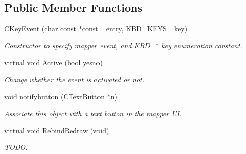 \subsection*{Public Member Functions}
\begin{DoxyCompactItemize}
\item 
\hypertarget{classCKeyEvent_a26db3746811c8498d0f7f4ca7e52d360}{\hyperlink{classCKeyEvent_a26db3746811c8498d0f7f4ca7e52d360}{C\-Key\-Event} (char const $\ast$const \-\_\-entry, K\-B\-D\-\_\-\-K\-E\-Y\-S \-\_\-key)}\label{classCKeyEvent_a26db3746811c8498d0f7f4ca7e52d360}

\begin{DoxyCompactList}\small\item\em Constructor to specify mapper event, and K\-B\-D\-\_\-$\ast$ key enumeration constant. \end{DoxyCompactList}\item 
\hypertarget{classCKeyEvent_a184277d7cd9c41090ae646a3b9887cf3}{virtual void \hyperlink{classCKeyEvent_a184277d7cd9c41090ae646a3b9887cf3}{Active} (bool yesno)}\label{classCKeyEvent_a184277d7cd9c41090ae646a3b9887cf3}

\begin{DoxyCompactList}\small\item\em Change whether the event is activated or not. \end{DoxyCompactList}\item 
\hypertarget{classCKeyEvent_ab05ca088ef648a08242be4f03adcbc00}{void \hyperlink{classCKeyEvent_ab05ca088ef648a08242be4f03adcbc00}{notifybutton} (\hyperlink{classCTextButton}{C\-Text\-Button} $\ast$n)}\label{classCKeyEvent_ab05ca088ef648a08242be4f03adcbc00}

\begin{DoxyCompactList}\small\item\em Associate this object with a text button in the mapper U\-I. \end{DoxyCompactList}\item 
\hypertarget{classCKeyEvent_af937bce9ca83b773aab24112ecef50dc}{virtual void \hyperlink{classCKeyEvent_af937bce9ca83b773aab24112ecef50dc}{Rebind\-Redraw} (void)}\label{classCKeyEvent_af937bce9ca83b773aab24112ecef50dc}

\begin{DoxyCompactList}\small\item\em T\-O\-D\-O. \end{DoxyCompactList}\end{DoxyCompactItemize}
